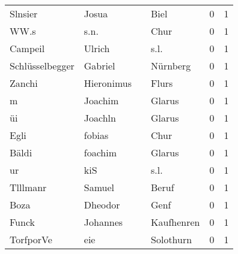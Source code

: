 \begin{tabular}{llllrr}
                  Slnsier &                              Josua &             &                                        Biel &          0 &         1 \\
                     WW.s &                               s.n. &             &                                        Chur &          0 &         1 \\
                  Campeil &                             Ulrich &             &                                        s.l. &          0 &         1 \\
          Schlüsselbegger &                            Gabriel &             &                                    Nürnberg &          0 &         1 \\
                   Zanchi &                         Hieronimus &             &                                       Flurs &          0 &         1 \\
                        m &                            Joachim &             &                                      Glarus &          0 &         1 \\
                       üi &                            Joachln &             &                                      Glarus &          0 &         1 \\
                     Egli &                             fobias &             &                                        Chur &          0 &         1 \\
                    Bäldi &                            foachim &             &                                      Glarus &          0 &         1 \\
                       ur &                                kiS &             &                                        s.l. &          0 &         1 \\
                 Tlllmanr &                             Samuel &             &                                       Beruf &          0 &         1 \\
                     Boza &                            Dheodor &             &                                        Genf &          0 &         1 \\
                    Funck &                           Johannes &             &                                  Kaufhenren &          0 &         1 \\
                TorfporVe &                                eie &             &                                   Solothurn &          0 &         1 \\

\end{tabular}
